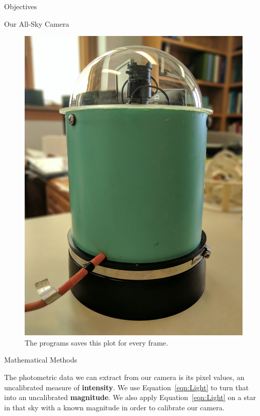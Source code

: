 \documentclass[final]{beamer}
\newlength{\onecolwid}
\begin{document}
\begin{frame}[t]
\begin{columns}[t]
\begin{column}{\onecolwid}
\begin{alertblock}{Objectives}
\end{alertblock}




\begin{alertblock}{Our All-Sky Camera}

\begin{figure}
\includegraphics[width=0.8\linewidth]{deesix.jpg}
\caption{The programs saves this plot for every frame.}
\end{figure}

\end{alertblock}
\begin{block}{Mathematical Methods}

The photometric data we can extract from our camera is its pixel values, an uncalibrated measure of \textbf{intensity}. We use Equation~\ref{eqn:Light} to turn that into an uncalibrated \textbf{magnitude}. We also apply Equation~\ref{eqn:Light} on a star in that sky with a known magnitude in order to calibrate our camera.


\end{block}
\end{column}
\end{columns}
\end{frame}
\end{document}
